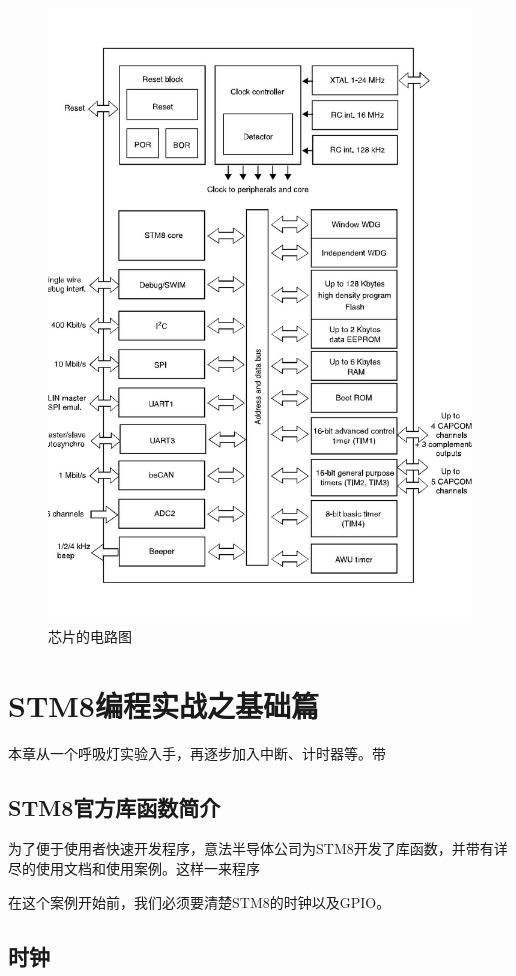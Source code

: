 \documentclass[a4paper]{book}
\newcommand{\chap}[1]{\newpage\thispagestyle{empty}\chapter{#1}\label{chap:\thechapter}}
\begin{document}
\begin{figure}[htbp]
\centering
\includegraphics{figures/circuit_diagram.jpg}
\caption{芯片的电路图}
\end{figure}

\chap{STM8编程实战之基础篇}

本章从一个呼吸灯实验入手，再逐步加入中断、计时器等。带

\section{STM8官方库函数简介}

为了便于使用者快速开发程序，意法半导体公司为STM8开发了库函数，并带有详尽的使用文档和使用案例。这样一来程序

在这个案例开始前，我们必须要清楚STM8的时钟以及GPIO。

\section{时钟}
\end{document}
